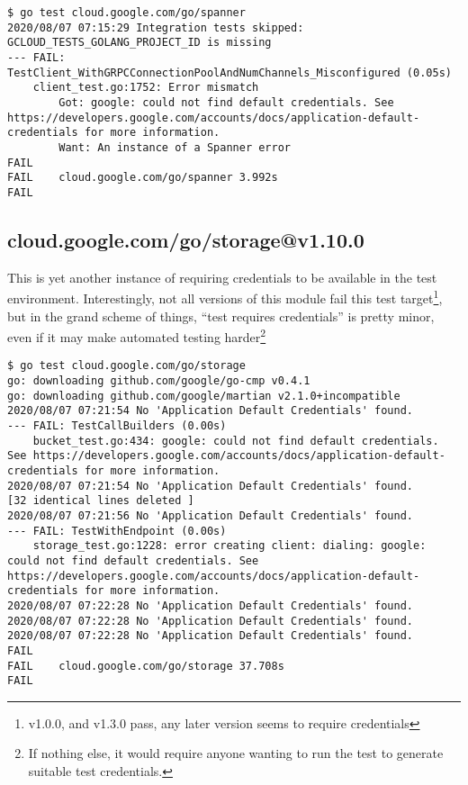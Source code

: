 \documentclass[a4paper]{paper}
\begin{document}
\begin{verbatim}
$ go test cloud.google.com/go/spanner
2020/08/07 07:15:29 Integration tests skipped: GCLOUD_TESTS_GOLANG_PROJECT_ID is missing
--- FAIL: TestClient_WithGRPCConnectionPoolAndNumChannels_Misconfigured (0.05s)
    client_test.go:1752: Error mismatch
        Got: google: could not find default credentials. See https://developers.google.com/accounts/docs/application-default-credentials for more information.
        Want: An instance of a Spanner error
FAIL
FAIL	cloud.google.com/go/spanner	3.992s
FAIL
\end{verbatim}

\subsection{cloud.google.com/go/storage@v1.10.0}

This is yet another instance of requiring credentials to be available
in the test environment. Interestingly, not all versions of this
module fail this test target\footnote{v1.0.0, and v1.3.0 pass, any
  later version seems to require credentials}, but in the grand scheme
of things, ``test requires credentials'' is pretty minor, even if it
may make automated testing harder\footnote{If nothing else, it would
  require anyone wanting to run the test to generate suitable test
  credentials.}

\begin{verbatim}
$ go test cloud.google.com/go/storage
go: downloading github.com/google/go-cmp v0.4.1
go: downloading github.com/google/martian v2.1.0+incompatible
2020/08/07 07:21:54 No 'Application Default Credentials' found.
--- FAIL: TestCallBuilders (0.00s)
    bucket_test.go:434: google: could not find default credentials. See https://developers.google.com/accounts/docs/application-default-credentials for more information.
2020/08/07 07:21:54 No 'Application Default Credentials' found.
[32 identical lines deleted ]
2020/08/07 07:21:56 No 'Application Default Credentials' found.
--- FAIL: TestWithEndpoint (0.00s)
    storage_test.go:1228: error creating client: dialing: google: could not find default credentials. See https://developers.google.com/accounts/docs/application-default-credentials for more information.
2020/08/07 07:22:28 No 'Application Default Credentials' found.
2020/08/07 07:22:28 No 'Application Default Credentials' found.
2020/08/07 07:22:28 No 'Application Default Credentials' found.
FAIL
FAIL	cloud.google.com/go/storage	37.708s
FAIL
\end{verbatim}
\end{document}
